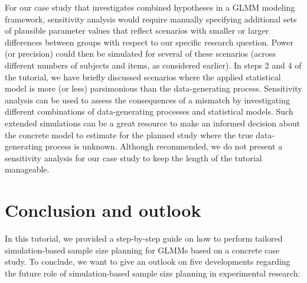 \documentclass[
  man,
  floatsintext,
  longtable,
  a4paper,
  nolmodern,
  notxfonts,
  notimes,
  colorlinks=true,linkcolor=blue,citecolor=blue,urlcolor=blue]{apa7}
\begin{document}
For our case study that investigates combined hypotheses in a GLMM
modeling framework, sensitivity analysis would require manually
specifying additional sets of plausible parameter values that reflect
scenarios with smaller or larger differences between groups with respect
to our specific research question. Power (or precision) could then be
simulated for several of these scenarios (across different numbers of
subjects and items, as considered earlier). In steps 2 and 4 of the
tutorial, we have briefly discussed scenarios where the applied
statistical model is more (or less) parsimonious than the
data-generating process. Sensitivity analysis can be used to assess the
consequences of a mismatch by investigating different combinations of
data-generating processes and statistical models. Such extended
simulations can be a great resource to make an informed decision about
the concrete model to estimate for the planned study where the true
data-generating process is unknown. Although recommended, we do not
present a sensitivity analysis for our case study to keep the length of
the tutorial manageable.

\section{Conclusion and outlook}\label{conclusion-and-outlook}

In this tutorial, we provided a step-by-step guide on how to perform
tailored simulation-based sample size planning for GLMMs based on a
concrete case study. To conclude, we want to give an outlook on five
developments regarding the future role of simulation-based sample size
planning in experimental research:
\end{document}
